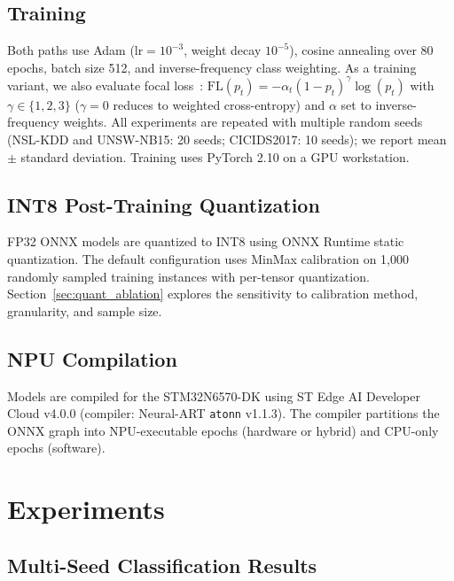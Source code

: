 \documentclass[10pt,twocolumn]{article}
\begin{document}
\subsection{Training}

Both paths use Adam ($\text{lr}=10^{-3}$, weight decay $10^{-5}$),
cosine annealing over 80 epochs, batch size 512, and inverse-frequency
class weighting.
As a training variant, we also evaluate focal
loss~\cite{lin2017focal}: $\text{FL}(p_t) = -\alpha_t (1-p_t)^\gamma
\log(p_t)$ with $\gamma \in \{1, 2, 3\}$ ($\gamma{=}0$ reduces to
weighted cross-entropy) and $\alpha$ set to inverse-frequency weights.
All experiments are repeated with multiple random seeds
(NSL-KDD and UNSW-NB15: 20 seeds; CICIDS2017: 10 seeds);
we report mean $\pm$ standard deviation.
Training uses PyTorch 2.10 on a GPU workstation.

\subsection{INT8 Post-Training Quantization}

FP32 ONNX models are quantized to INT8 using ONNX Runtime static
quantization. The default configuration uses MinMax calibration on 1,000
randomly sampled training instances with per-tensor quantization.
Section~\ref{sec:quant_ablation} explores the sensitivity to calibration
method, granularity, and sample size.

\subsection{NPU Compilation}

Models are compiled for the STM32N6570-DK using ST Edge AI Developer Cloud
v4.0.0 (compiler: Neural-ART \texttt{atonn} v1.1.3). The compiler
partitions the ONNX graph into NPU-executable epochs (hardware or hybrid)
and CPU-only epochs (software).

\section{Experiments}
\label{sec:experiments}

\subsection{Multi-Seed Classification Results}
\end{document}
